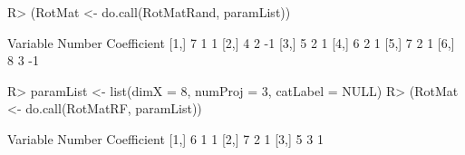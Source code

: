 \documentclass[nojss]{jss}
\numberwithin{equation}{section}
\begin{document}
\begin{Schunk}
\begin{Sinput}
R> (RotMat <- do.call(RotMatRand, paramList))
\end{Sinput}
\begin{Soutput}
     Variable Number Coefficient
[1,]        7      1           1
[2,]        4      2          -1
[3,]        5      2           1
[4,]        6      2           1
[5,]        7      2           1
[6,]        8      3          -1
\end{Soutput}
\begin{Sinput}
R> paramList <- list(dimX = 8, numProj = 3, catLabel = NULL)
R> (RotMat <- do.call(RotMatRF, paramList))
\end{Sinput}
\begin{Soutput}
     Variable Number Coefficient
[1,]        6      1           1
[2,]        7      2           1
[3,]        5      3           1
\end{Soutput}
\end{Schunk}
\end{document}
